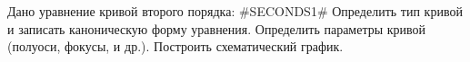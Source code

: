 Дано уравнение кривой второго порядка:
#SECONDS1#
Определить тип кривой и записать каноническую форму уравнения. Определить параметры кривой (полуоси, фокусы, и др.). Построить схематический график. 